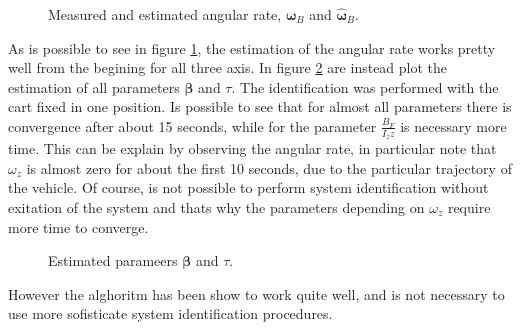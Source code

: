 \begin{figure}[h]
	\centering
 	
 	\caption{Measured and estimated angular rate, $\boldsymbol{\omega}_B$ and $\hat{\boldsymbol{\omega}}_B$.}
 	\label{fig:omegaKalman}		
\end{figure}

\noindent As is possible to see in figure \ref{fig:omegaKalman}, the estimation of the angular rate works pretty well from the begining for all three axis. In figure \ref{fig:betaTauKalman} are instead plot the estimation of all parameters $\boldsymbol{\beta}$ and $\tau$. The identification was performed with the cart fixed in one position. Is possible to see that for almost all parameters there is convergence after about 15 seconds, while for the parameter $\frac{B_F}{I_zz}$ is necessary more time. This can be explain by observing the angular rate, in particular note that $\omega_z$ is almost zero for about the first 10 seconds, due to the particular trajectory of the vehicle. Of course, is not possible to perform system identification without exitation of the system and thats why the parameters depending on $\omega_z$ require more time to converge.

\begin{figure}[h]
	\centering
	
	
	\caption{Estimated parameers $\boldsymbol{\beta}$ and $\tau$.}
	\label{fig:betaTauKalman}
\end{figure}

\noindent However the alghoritm has been show to work quite well, and is not necessary to use more sofisticate system identification procedures.
